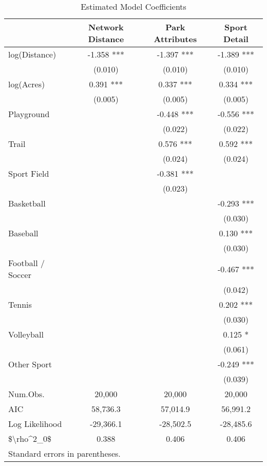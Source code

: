 \documentclass[3p, authoryear, review]{elsarticle} %
\begin{document}
\begin{table}

\caption{\label{tab:base-modelsummary}Estimated Model Coefficients}
\centering
\begin{tabular}[t]{lccc}
\toprule
  & Network Distance & Park Attributes & Sport Detail\\
\midrule
log(Distance) & -1.358 *** & -1.397 *** & -1.389 ***\\
 & (0.010) & (0.010) & (0.010)\\
log(Acres) & 0.391 *** & 0.337 *** & 0.334 ***\\
 & (0.005) & (0.005) & (0.005)\\
Playground &  & -0.448 *** & -0.556 ***\\
 &  & (0.022) & (0.022)\\
Trail &  & 0.576 *** & 0.592 ***\\
 &  & (0.024) & (0.024)\\
Sport Field &  & -0.381 *** & \\
 &  & (0.023) & \\
Basketball &  &  & -0.293 ***\\
 &  &  & \vphantom{2} (0.030)\\
Baseball &  &  & 0.130 ***\\
 &  &  & \vphantom{1} (0.030)\\
Football / Soccer &  &  & -0.467 ***\\
 &  &  & (0.042)\\
Tennis &  &  & 0.202 ***\\
 &  &  & (0.030)\\
Volleyball &  &  & 0.125 *\\
 &  &  & (0.061)\\
Other Sport &  &  & -0.249 ***\\
 &  &  & (0.039)\\
\midrule
Num.Obs. & 20,000 & 20,000 & 20,000\\
AIC & 58,736.3 & 57,014.9 & 56,991.2\\
Log Likelihood & -29,366.1 & -28,502.5 & -28,485.6\\
\$\textbackslash{}rho\textasciicircum{}2\_0\$ & 0.388 & 0.406 & 0.406\\
\bottomrule
\multicolumn{4}{l}{\textsuperscript{} Standard errors in parentheses.}\\
\end{tabular}
\end{table}
\end{document}
